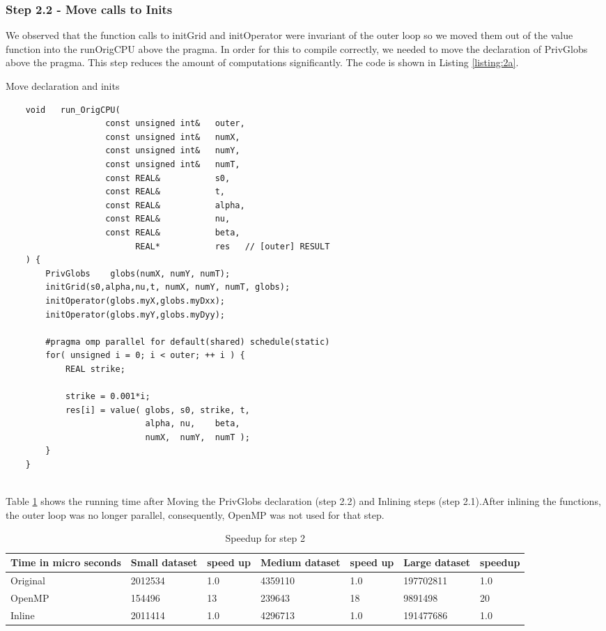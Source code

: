 \documentclass{article}
\begin{document}
\subsubsection*{Step 2.2 - Move calls to Inits}
We observed that the function calls to initGrid and initOperator were invariant of the outer loop so we moved them out of the value function into the runOrigCPU above the pragma. In order for this to compile correctly, we needed to move the declaration of PrivGlobs above the pragma. This step reduces the amount of computations significantly. The code is shown in Listing \ref{listing:2a}.
\begin{listing}[h]
\caption{Move declaration and inits}
\begin{verbatim}
    void   run_OrigCPU(  
                    const unsigned int&   outer,
                    const unsigned int&   numX,
                    const unsigned int&   numY,
                    const unsigned int&   numT,
                    const REAL&           s0,
                    const REAL&           t, 
                    const REAL&           alpha, 
                    const REAL&           nu, 
                    const REAL&           beta,
                          REAL*           res   // [outer] RESULT
    ) {
        PrivGlobs    globs(numX, numY, numT);
        initGrid(s0,alpha,nu,t, numX, numY, numT, globs);
        initOperator(globs.myX,globs.myDxx);
        initOperator(globs.myY,globs.myDyy);
        
        #pragma omp parallel for default(shared) schedule(static)
        for( unsigned i = 0; i < outer; ++ i ) {
            REAL strike;
    
            strike = 0.001*i;
            res[i] = value( globs, s0, strike, t,
                            alpha, nu,    beta,
                            numX,  numY,  numT );
        }
    } 
 
\end{verbatim}
\label{listing:2a}
\end{listing}
Table \ref{my-label2} shows the running time after Moving the PrivGlobs declaration (step 2.2) and Inlining steps (step 2.1).After inlining the functions, the outer loop was no longer parallel, consequently, OpenMP was not used for that step.
\begin{table}[ht]
\centering
\caption{Speedup for step 2}
\label{my-label2}
\begin{tabular}{|l|l|l|l|l|l|l|}
\hline
Time in micro seconds & Small dataset & speed up & Medium dataset & speed up & Large dataset & speedup \\ \hline
Original         & 2012534       &  1.0        & 4359110        &  1.0        & 197702811     &  1.0       \\ \hline
OpenMP           & 154496        &  13         & 239643         &  18         & 9891498       &  20       \\ \hline
Inline           & 2011414       &  1.0        & 4296713        &  1.0        & 191477686     &  1.0       \\ \hline
\end{tabular}
\end{table}
\end{document}
